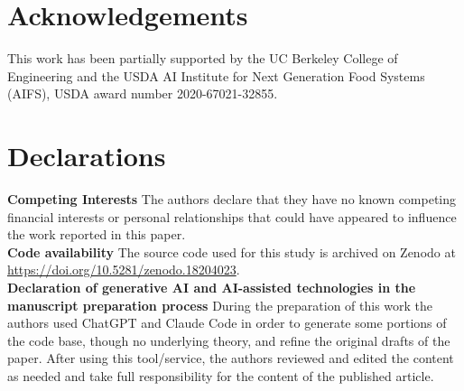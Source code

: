 \documentclass[preprint,12pt]{elsarticle}
\begin{document}
\pagebreak
\section{Acknowledgements}

This work has been partially supported by the UC Berkeley College of Engineering and the USDA AI Institute for Next Generation Food Systems (AIFS), USDA award number 2020-67021-32855.

\section*{Declarations}

\noindent\textbf{Competing Interests}
\noindent The authors declare that they have no known competing financial interests or personal relationships that could have appeared to influence the work reported in this paper. \\

\noindent\textbf{Code availability}
\noindent The source code used for this study is archived on Zenodo at \url{https://doi.org/10.5281/zenodo.18204023}. \\

\noindent\textbf{Declaration of generative AI and AI-assisted technologies in the manuscript preparation process}
\noindent During the preparation of this work the authors used ChatGPT and Claude Code in order to generate some portions of the code base, though no underlying theory, and refine the original drafts of the paper. After using this tool/service, the authors reviewed and edited the content as needed and take full responsibility for the content of the published article.

 

\end{document}

